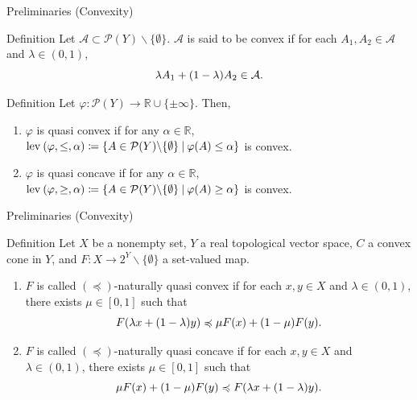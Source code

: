 \documentclass[aspectratio=169, dvipdfmx, 11pt]{beamer}
\newcommand{\RealNumberSet}{\mathbb{R}}
\newcommand{\OrderingLevelSets}[3]{\text{\rm lev\:$({#1}, {#2}, {#3})$}} %
\newcommand{\SetForm}[2]{
  \{{#1}\:|\:{#2}\}
}
\begin{document}
\begin{frame}{Preliminaries (Convexity)}
  \begin{block}{Definition \cite{MR3458699}}
    Let $\mathcal{A} \subset \mathcal{P}(Y) \backslash \{\emptyset\}$. $\mathcal{A}$ is said to be convex if for each $A_1, A_2 \in \mathcal{A}$ and $\lambda \in (0,1)$,
    \begin{equation}
      \lambda A_1 + (1-\lambda) A_2 \in \mathcal{A}. \notag
    \end{equation}
  \end{block}

  \begin{block}{Definition \cite{MR3458699}}
    Let $\varphi \colon \mathcal{P}(Y) \to \RealNumberSet \cup \{\pm \infty\}$. Then,
    \begin{enumerate}
      \item $\varphi$ is quasi convex if for any $\alpha \in \RealNumberSet$,
            $\OrderingLevelSets{\varphi}{\leq}{\alpha} \coloneqq \SetForm{A \in \mathcal{P}(Y) \backslash \{\emptyset\}}{\varphi(A) \leq \alpha}$ is convex.
      \item $\varphi$ is quasi concave if for any $\alpha \in \RealNumberSet$,
            $\OrderingLevelSets{\varphi}{\geq}{\alpha} \coloneqq \SetForm{A \in \mathcal{P}(Y) \backslash \{\emptyset\}}{\varphi(A) \geq \alpha}$ is convex.
    \end{enumerate}
  \end{block}
\end{frame}

\begin{frame}{Preliminaries (Convexity)}
  \begin{block}{Definition}
    Let $X$ be a nonempty set, $Y$ a real topological vector space, $C$ a convex cone in $Y$, and $F\colon X \to 2^Y \backslash \{\emptyset\}$ a set-valued map.
    \begin{enumerate}
      \item $F$ is called $(\preccurlyeq)$-naturally quasi convex if for each $x,y \in X$ and $\lambda \in (0,1)$, there exists $\mu \in [0,1]$ such that
            \begin{equation}
              F(\lambda x + (1-\lambda)y) \preccurlyeq \mu F(x) + (1-\mu) F(y). \notag
            \end{equation}
      \item $F$ is called $(\preccurlyeq)$-naturally quasi concave if for each $x,y \in X$ and $\lambda \in (0,1)$, there exists $\mu \in [0,1]$ such that
            \begin{equation}
              \mu F(x) + (1-\mu) F(y) \preccurlyeq F(\lambda x + (1-\lambda)y). \notag
            \end{equation}
    \end{enumerate}
  \end{block}
\end{frame}
\end{document}
